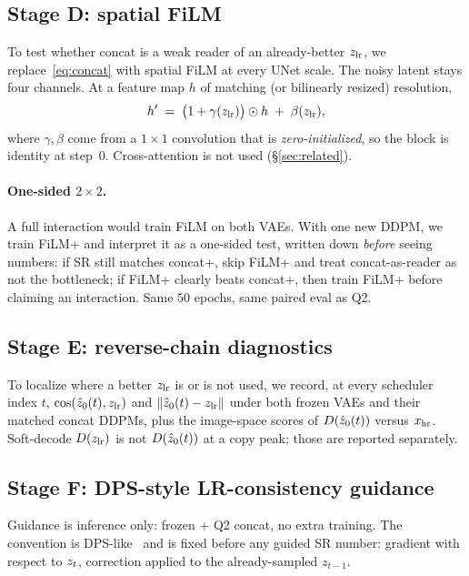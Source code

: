\subsection{Stage D: spatial FiLM}
\label{sec:method-film}

To test whether concat is a weak reader of an already-better
$z_{\mathrm{lr}}$, we replace~\eqref{eq:concat} with spatial FiLM
\citep{perez2018film} at every UNet scale.
The noisy latent stays four channels.
At a feature map $h$ of matching (or bilinearly resized) resolution,
\begin{equation}
  \label{eq:film}
  h' \;=\; \bigl(1+\gamma(z_{\mathrm{lr}})\bigr)\odot h \;+\; \beta(z_{\mathrm{lr}}),
\end{equation}
where $\gamma,\beta$ come from a $1{\times}1$ convolution that is
\emph{zero-initialized}, so the block is identity at step~$0$.
Cross-attention is not used (\S\ref{sec:related}).

\paragraph{One-sided $2{\times}2$.}
A full interaction would train FiLM on both VAEs.
With one new DDPM, we train FiLM+\vaesr{} and interpret it as a
one-sided test, written down \emph{before} seeing numbers:
if SR still matches concat+\vaesr, skip FiLM+\vaeone{} and treat
concat-as-reader as not the bottleneck;
if FiLM+\vaesr{} clearly beats concat+\vaesr, then train FiLM+\vaeone{}
before claiming an interaction.
Same $50$ epochs, same paired eval as Q2.

\subsection{Stage E: reverse-chain diagnostics}
\label{sec:method-traj}

To localize where a better $z_{\mathrm{lr}}$ is or is not used, we record, at
every scheduler index $t$,
$\cos(\hat{z}_{0}(t),z_{\mathrm{lr}})$ and $\lVert\hat{z}_{0}(t)-z_{\mathrm{lr}}\rVert$ under both
frozen VAEs and their matched concat DDPMs, plus the image-space
scores of $D(\hat{z}_{0}(t))$ versus $x_{\mathrm{hr}}$.
Soft-decode $D(z_{\mathrm{lr}})$ is not $D(\hat{z}_{0}(t))$ at a copy peak;
those are reported separately.

\subsection{Stage F: DPS-style LR-consistency guidance}
\label{sec:method-guide}

Guidance is inference only: frozen \vaesr{} + Q2 concat, no extra
training.
The convention is DPS-like~\citep{chung2023diffusion} and is fixed
before any guided SR number: gradient with respect to $z_{t}$,
correction applied to the already-sampled $z_{t-1}$.

